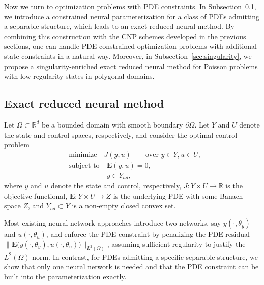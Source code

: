 \documentclass{article}
\numberwithin{equation}{section}
\begin{document}
Now we turn to optimization problems with PDE constraints. 
In Subsection~\ref{sec:pde_reduced}, we introduce a constrained neural parameterization for a class of PDEs admitting a separable structure, which leads to an exact reduced neural method. By combining this construction with the CNP schemes developed in the previous sections, one can handle PDE-constrained optimization problems with additional state constraints in a natural way. Moreover, in Subsection~\ref{sec:singularity}, we propose a singularity-enriched exact reduced neural method for Poisson problems with low-regularity states in polygonal domains.

\subsection{Exact reduced neural method}\label{sec:pde_reduced}

Let $\Omega\subset\mathbb{R}^d$ be a bounded domain with smooth boundary $\partial\Omega$. Let $Y$ and $U$ denote the state and control spaces, respectively, and consider the optimal control problem
\begin{align*}
    &\text{minimize}\quad J(y,u)\qquad\text{over } y\in Y, u\in U,\\
    &\text{subject to}\quad
    \mathbf{E}(y,u)=0,\\
    &\phantom{\text{subject to}}\quad y\in Y_{ad},
\end{align*}
where $y$ and $u$ denote the state and control, respectively, $J:Y\times U\to\mathbb{R}$ is the objective functional, $\mathbf{E}:Y\times U\to Z$ is the underlying PDE with some Banach space $Z$, and $Y_{ad}\subset Y$ is a non-empty closed convex set. 

Most existing neural network approaches introduce two networks, say $y(\cdot,\theta_y)$ and $u(\cdot,\theta_u)$, and enforce the PDE constraint by penalizing the PDE residual $\bigl\|\mathbf{E}\bigl(y(\cdot,\theta_y),u(\cdot,\theta_u)\bigr)\bigr\|_{L^2(\Omega)}$, assuming sufficient regularity to justify the $L^2(\Omega)$-norm. In contrast, for PDEs admitting a specific separable structure, we show that only one neural network is needed and that the PDE constraint can be built into the parameterization exactly. 
\end{document}
